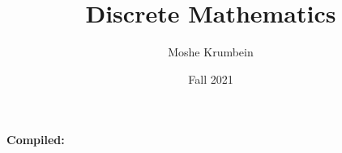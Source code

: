 
\usepackage{subfiles}
\title{Discrete Mathematics}
\author{Moshe Krumbein}
\date{Fall 2021}



\begin{titlepage}
    \centering
    {\huge\bfseries \thetitle\par}
    \vspace{2cm}
    {\Large \theauthor\par}
    {\large \thedate\par}
    \vfill
    \begin{center}
        \large{\textbf{Compiled:} \DTMnow}
    \end{center}
\end{titlepage}

\setcounter{tocdepth}{2}
\tableofcontents
\cleardoublepage














